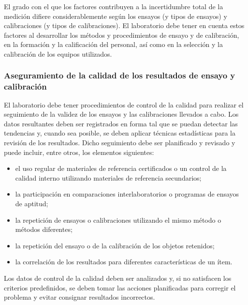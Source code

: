\par \noindent
El grado con el que los factores contribuyen a la incertidumbre total de la medición difiere
considerablemente según los ensayos (y tipos de ensayos) y calibraciones (y tipos de calibraciones). El
laboratorio debe tener en cuenta estos factores al desarrollar los métodos y procedimientos de ensayo y de
calibración, en la formación y la calificación del personal, así como en la selección y la calibración de los
equipos utilizados.

\subsubsection{Aseguramiento de la calidad de los resultados de ensayo y calibración}

\par 
El laboratorio debe tener procedimientos de control de la calidad para realizar el seguimiento de la
validez de los ensayos y las calibraciones llevados a cabo. Los datos resultantes deben ser registrados en
forma tal que se puedan detectar las tendencias y, cuando sea posible, se deben aplicar técnicas estadísticas
para la revisión de los resultados. Dicho seguimiento debe ser planificado y revisado y puede incluir, entre
otros, los elementos siguientes:

\begin{itemize}
\item el uso regular de materiales de referencia certificados o un control de la calidad interno utilizando
materiales de referencia secundarios;

\item la participación en comparaciones interlaboratorios o programas de ensayos de aptitud;

\item la repetición de ensayos o calibraciones utilizando el mismo método o métodos diferentes;

\item la repetición del ensayo o de la calibración de los objetos retenidos;

\item la correlación de los resultados para diferentes características de un ítem.
\end{itemize}

\par \noindent
Los datos de control de la calidad deben ser analizados y, si no satisfacen los criterios predefinidos,
se deben tomar las acciones planificadas para corregir el problema y evitar consignar resultados incorrectos.

